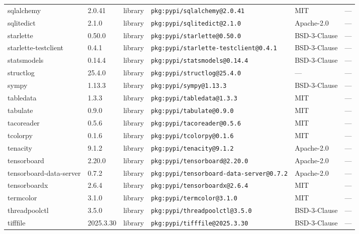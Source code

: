 \documentclass[11pt,a4paper]{article}
\begin{document}
\begin{longtable}{|p{4cm}|p{2cm}|p{1.6cm}|p{5cm}|p{1.5cm}|p{3.5cm}|}
\raggedright sqlalchemy & 2.0.41 & library & \small\texttt{pkg:pypi/sqlalchemy@2.0.41} & MIT & \small — \\
\raggedright sqlitedict & 2.1.0 & library & \small\texttt{pkg:pypi/sqlitedict@2.1.0} & Apache-2.0 & \small — \\
\raggedright starlette & 0.50.0 & library & \small\texttt{pkg:pypi/starlette@0.50.0} & BSD-3-Clause & \small — \\
\raggedright starlette-testclient & 0.4.1 & library & \small\texttt{pkg:pypi/starlette-testclient@0.4.1} & BSD-3-Clause & \small — \\
\raggedright statsmodels & 0.14.4 & library & \small\texttt{pkg:pypi/statsmodels@0.14.4} & BSD-3-Clause & \small — \\
\raggedright structlog & 25.4.0 & library & \small\texttt{pkg:pypi/structlog@25.4.0} & — & \small — \\
\raggedright sympy & 1.13.3 & library & \small\texttt{pkg:pypi/sympy@1.13.3} & BSD-3-Clause & \small — \\
\raggedright tabledata & 1.3.3 & library & \small\texttt{pkg:pypi/tabledata@1.3.3} & MIT & \small — \\
\raggedright tabulate & 0.9.0 & library & \small\texttt{pkg:pypi/tabulate@0.9.0} & MIT & \small — \\
\raggedright tacoreader & 0.5.6 & library & \small\texttt{pkg:pypi/tacoreader@0.5.6} & MIT & \small — \\
\raggedright tcolorpy & 0.1.6 & library & \small\texttt{pkg:pypi/tcolorpy@0.1.6} & MIT & \small — \\
\raggedright tenacity & 9.1.2 & library & \small\texttt{pkg:pypi/tenacity@9.1.2} & Apache-2.0 & \small — \\
\raggedright tensorboard & 2.20.0 & library & \small\texttt{pkg:pypi/tensorboard@2.20.0} & Apache-2.0 & \small — \\
\raggedright tensorboard-data-server & 0.7.2 & library & \small\texttt{pkg:pypi/tensorboard-data-server@0.7.2} & Apache-2.0 & \small — \\
\raggedright tensorboardx & 2.6.4 & library & \small\texttt{pkg:pypi/tensorboardx@2.6.4} & MIT & \small — \\
\raggedright termcolor & 3.1.0 & library & \small\texttt{pkg:pypi/termcolor@3.1.0} & MIT & \small — \\
\raggedright threadpoolctl & 3.5.0 & library & \small\texttt{pkg:pypi/threadpoolctl@3.5.0} & BSD-3-Clause & \small — \\
\raggedright tifffile & 2025.3.30 & library & \small\texttt{pkg:pypi/tifffile@2025.3.30} & BSD-3-Clause & \small — \\

\end{longtable}
\end{document}
